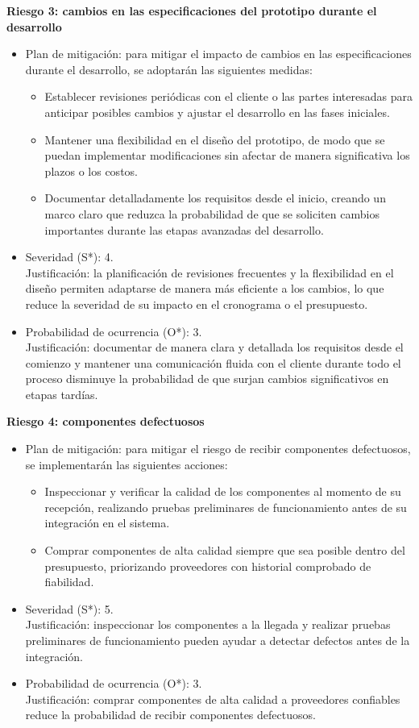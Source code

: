 \documentclass[
11pt, %
]{charter}
\begin{document}
\textbf{Riesgo 3: cambios en las especificaciones del prototipo durante el desarrollo}
\begin{itemize}
	\item Plan de mitigación: para mitigar el impacto de cambios en las especificaciones durante el desarrollo, se adoptarán las siguientes medidas:
	\begin{itemize}
		\item Establecer revisiones periódicas con el cliente o las partes interesadas para anticipar posibles cambios y ajustar el desarrollo en las fases iniciales.
		\item Mantener una flexibilidad en el diseño del prototipo, de modo que se puedan implementar modificaciones sin afectar de manera significativa los plazos o los costos.
		\item Documentar detalladamente los requisitos desde el inicio, creando un marco claro que reduzca la probabilidad de que se soliciten cambios importantes durante las etapas avanzadas del desarrollo.
	\end{itemize}
    \item Severidad (S*): 4.\\
    Justificación: la planificación de revisiones frecuentes y la flexibilidad en el diseño permiten adaptarse de manera más eficiente a los cambios, lo que reduce la severidad de su impacto en el cronograma o el presupuesto.
    \item Probabilidad de ocurrencia (O*): 3.\\
    Justificación: documentar de manera clara y detallada los requisitos desde el comienzo y mantener una comunicación fluida con el cliente durante todo el proceso disminuye la probabilidad de que surjan cambios significativos en etapas tardías.
\end{itemize}

\textbf{Riesgo 4: componentes defectuosos}
\begin{itemize}
	\item Plan de mitigación: para mitigar el riesgo de recibir componentes defectuosos, se implementarán las siguientes acciones:
	\begin{itemize}
		\item Inspeccionar y verificar la calidad de los componentes al momento de su recepción, realizando pruebas preliminares de funcionamiento antes de su integración en el sistema.
		\item Comprar componentes de alta calidad siempre que sea posible dentro del presupuesto, priorizando proveedores con historial comprobado de fiabilidad.
	\end{itemize}
    \item Severidad (S*): 5.\\
    Justificación: inspeccionar los componentes a la llegada y realizar pruebas preliminares de funcionamiento pueden ayudar a detectar defectos antes de la integración.
    \item Probabilidad de ocurrencia (O*): 3.\\
    Justificación: comprar componentes de alta calidad a proveedores confiables reduce la probabilidad de recibir componentes defectuosos.
\end{itemize}
\end{document}
